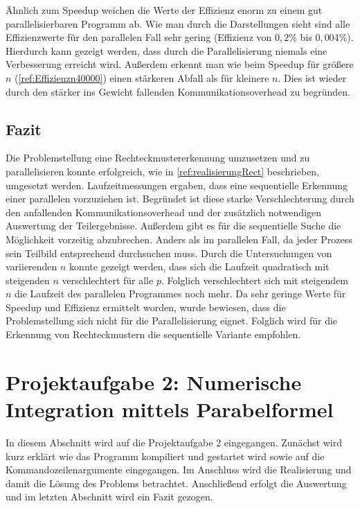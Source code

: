 Ähnlich zum Speedup weichen die Werte der Effizienz enorm zu einem gut parallelisierbaren Programm ab. 
Wie man durch die Darstellungen sieht sind alle Effizienzwerte für den parallelen Fall sehr gering (Effizienz von $0,2$\% bis $0,004$\%).
Hierdurch kann gezeigt werden, dass durch die Parallelisierung niemals eine Verbesserung erreicht wird. 
Außerdem erkennt man wie beim Speedup für größere $n$ (\autoref{ref:Effizienzn40000}) einen stärkeren Abfall als für kleinere $n$.
Dies ist wieder durch den stärker ins Gewicht fallenden Kommunikationsoverhead zu begründen.

\subsection{Fazit}
Die Problemstellung eine Rechteckmustererkennung umzusetzen und zu parallelisieren konnte erfolgreich, wie in \autoref{ref:realisierungRect} beschrieben, umgesetzt werden. 
Laufzeitmessungen ergaben, dass eine sequentielle Erkennung einer parallelen vorzuziehen ist.
Begründet ist diese starke Verschlechterung durch den anfallenden Kommunikationsoverhead und der zusätzlich notwendigen Auswertung der Teilergebnisse. 
Außerdem gibt es für die sequentielle Suche die Möglichkeit vorzeitig abzubrechen.
Anders als im parallelen Fall, da jeder Prozess sein Teilbild entsprechend durchsuchen muss.
Durch die Untersuchungen von variierenden $n$ konnte gezeigt werden, dass sich die Laufzeit quadratisch mit steigenden $n$ verschlechtert für alle $p$.
Folglich verschlechtert sich mit steigendem $n$ die Laufzeit des parallelen Programmes noch mehr.
Da sehr geringe Werte für Speedup und Effizienz ermittelt worden, wurde bewiesen, dass die Problemstellung sich nicht für die Parallelisierung eignet.
Folglich wird für die Erkennung von Rechteckmustern die sequentielle Variante empfohlen.

\pagebreak
\section{Projektaufgabe 2: Numerische Integration mittels Parabelformel}
\lstset{language=Fortran,frame=none, keepspaces=false,tabsize=1,captionpos=b, basicstyle=\scriptsize,showstringspaces=false,breaklines=true}  
In diesem Abschnitt wird auf die Projektaufgabe 2 eingegangen.
Zunächst wird kurz erklärt wie das Programm kompiliert und gestartet wird sowie auf die Kommandozeilenargumente eingegangen.
Im Anschluss wird die Realisierung und damit die Lösung des Problems betrachtet.
Anschließend erfolgt die Auswertung und im letzten Abschnitt wird ein Fazit gezogen.

